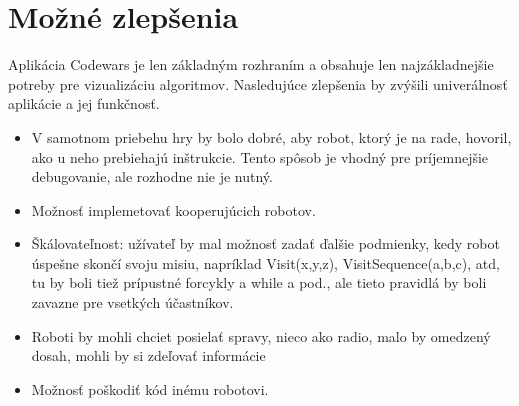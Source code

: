 \section{Možné zlepšenia}
Aplikácia Codewars je len základným rozhraním a obsahuje len najzákladnejšie potreby pre vizualizáciu algoritmov. Nasledujúce zlepšenia by zvýšili univerálnosť aplikácie a jej funkčnosť.\\
\begin{itemize}
\item V samotnom priebehu hry by bolo dobré, aby robot, ktorý je na rade, hovoril, ako u neho prebiehajú inštrukcie. Tento spôsob je vhodný pre príjemnejšie debugovanie, ale rozhodne nie je nutný.
\item Možnosť implemetovať kooperujúcich robotov.
\item Škálovateľnost: užívateľ by mal možnosť zadať ďalšie podmienky, kedy robot úspešne skončí svoju misiu, napríklad Visit(x,y,z), VisitSequence(a,b,c), atd, tu by boli tiež prípustné forcykly  a while a pod., ale tieto pravidlá by boli zavazne pre vsetkých účastníkov.
\item Roboti by mohli chciet posielať spravy, nieco ako radio, malo by omedzený dosah, mohli by si zdeľovať informácie 
\item Možnosť poškodiť kód inému robotovi.
\end{itemize}
%


%
